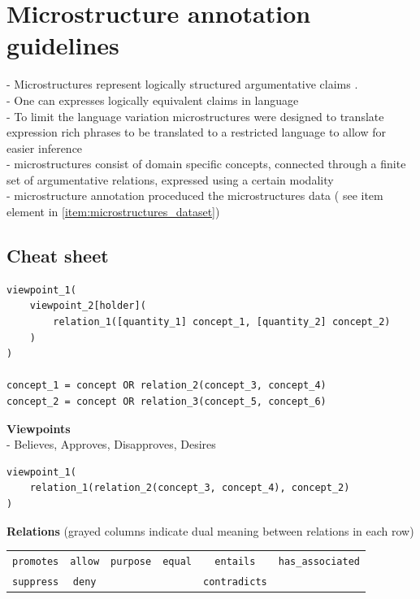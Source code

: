 \section{Microstructure annotation guidelines}
\label{sec:microstructure_annotation_appendix}

\noindent - Microstructures represent logically structured argumentative claims
\citep{boltuzic2017toward}. \\
- One can expresses logically equivalent claims in language \\
- To limit the language variation microstructures were designed to translate
expression rich phrases to be translated to a restricted language to allow for
easier inference \\
- microstructures  consist of domain specific concepts, 
connected through a finite set of argumentative relations, expressed using 
a certain modality \\
- microstructure annotation proceduced the microstructures data (
see item element in \ref{item:microstructures_dataset})\\

\newpage
\subsection{Cheat sheet}

\begin{verbatim}
viewpoint_1(
	viewpoint_2[holder](
		relation_1([quantity_1] concept_1, [quantity_2] concept_2)
	)
)

concept_1 = concept OR relation_2(concept_3, concept_4)
concept_2 = concept OR relation_3(concept_5, concept_6)

\end{verbatim}

\noindent \textbf{Viewpoints} \\
- Believes, Approves, Disapproves, Desires

\begin{verbatim}
viewpoint_1(
	relation_1(relation_2(concept_3, concept_4), concept_2)
)
\end{verbatim}

\noindent \textbf{Relations} (grayed columns indicate dual meaning between relations in each row)

\begin{table}[!htb]
\begin{tabular}{|c c c c c c|}
\hline
\cellcolor{gray!25} \texttt{promotes} & \cellcolor{gray!25}\texttt{allow} & \texttt{purpose} & \texttt{equal} & \cellcolor{gray!25}\texttt{entails}     & \texttt{has\_associated} \\
\cellcolor{gray!25} \texttt{suppress} & \cellcolor{gray!25}\texttt{deny}  &         &       & \cellcolor{gray!25}\texttt{contradicts} &  \\
\hline
\end{tabular}
\end{table}


